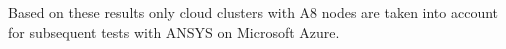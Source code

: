 \documentclass[3p,times]{elsarticle}
\begin{document}
Based on these results only cloud clusters with A8 nodes are taken into account for subsequent tests with ANSYS on Microsoft Azure.


\end{document}
